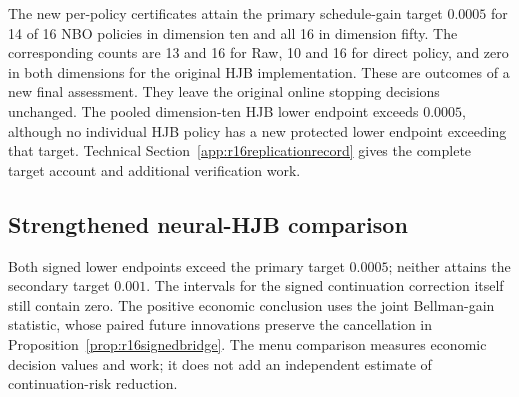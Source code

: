 The new per-policy certificates attain the primary schedule-gain target
$0.0005$ for 14 of 16 NBO policies in dimension ten and all 16 in dimension
fifty. The corresponding counts are 13 and 16 for Raw, 10 and 16 for direct
policy, and zero in both dimensions for the original HJB implementation.
These are outcomes of a new final assessment. They leave the original online
stopping decisions unchanged. The pooled dimension-ten HJB lower endpoint
exceeds $0.0005$, although no individual HJB policy has a new protected lower
endpoint exceeding that target. Technical
Section~\ref{app:r16replicationrecord} gives the complete target account and
additional verification work.

\subsection{Strengthened neural-HJB comparison}\label{sec:r16hjbresults}



\label{sec:r16mechanismresults}
Both signed lower endpoints exceed the primary target $0.0005$; neither
attains the secondary target $0.001$. The intervals for the signed continuation
correction itself still contain zero. The positive economic conclusion uses
the joint Bellman-gain statistic, whose paired future innovations preserve
the cancellation in Proposition~\ref{prop:r16signedbridge}.
The menu comparison measures economic decision values and work; it does not
add an independent estimate of continuation-risk reduction.
